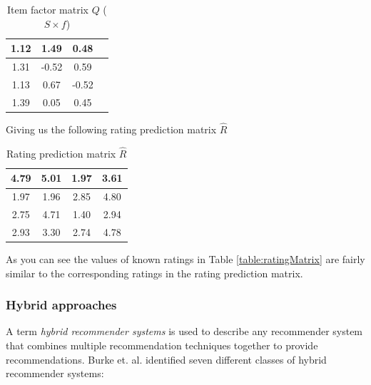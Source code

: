 \begin{table}[!htbp]
\centering
\begin{tabular}{|c|c|c|c|}
\hline
1.12    &   1.49    &   0.48\\ \hline
1.31    &-0.52  &0.59\\ \hline
1.13    &0.67&  -0.52\\ \hline
1.39    &0.05&  0.45\\ \hline
\end{tabular}
\label{table:UserFeature}
\caption{Item factor matrix $Q$ ($S \times f$)}
\end{table}

Giving us the following rating prediction matrix $\hat{R}$

\begin{table}[!htbp]
\centering
\begin{tabular}{|c|c|c|c|}
\hline
4.79    &5.01   &1.97   &3.61 \\ \hline
1.97    &1.96   &2.85   &4.80 \\ \hline
2.75    &4.71   &1.40   &2.94 \\ \hline
2.93    &3.30   &2.74   &4.78 \\ \hline
\end{tabular}
\label{table:PredictionMatrix}
\caption{Rating prediction matrix $\hat{R}$}
\end{table}

As you can see the values of known ratings in Table \ref{table:ratingMatrix} are fairly similar to the corresponding ratings in the rating prediction matrix.

\subsubsection{Hybrid approaches}

A term \emph{hybrid recommender systems} is used to describe any recommender system that combines multiple recommendation techniques together to provide recommendations. Burke et. al. \cite{Burke2002} identified seven different classes of hybrid recommender systems:

